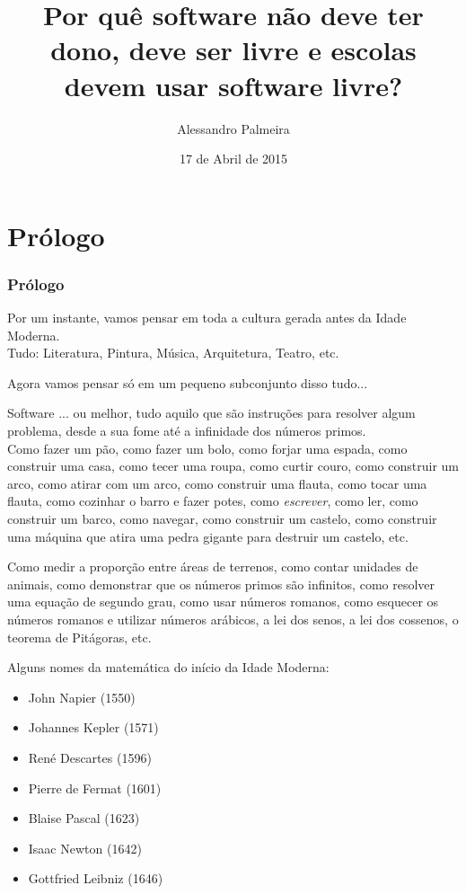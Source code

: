 \documentclass[serif,mathserif]{beamer}
\author[Alessandro Palmeira]{Alessandro Palmeira}
\title[Software Livre e Ensino\hspace{2em}\insertframenumber/\inserttotalframenumber]{Por quê software não deve ter dono, deve ser livre e escolas devem usar software livre?}
\date{17 de Abril de 2015} %
\institute{MAC0470 - Desenvolvimento de Software Livre}
\begin{document}
\maketitle

\section{Prólogo}  %

\begin{frame}
  \frametitle{Prólogo}
  Por um instante, vamos pensar em toda a cultura gerada antes da Idade Moderna.\pause\\
  Tudo: Literatura, Pintura, Música, Arquitetura, Teatro, etc.\pause
  
  \vspace{5mm} %
  Agora vamos pensar só em um pequeno subconjunto disso tudo...
\end{frame}

\begin{frame}
  Software\pause
  ... ou melhor, tudo aquilo que são instruções para resolver algum problema, desde a
  sua fome até a infinidade dos números primos.\pause\\
  Como fazer um pão, \pause como fazer um bolo, \pause como forjar uma espada, \pause como construir uma casa, \pause
  como tecer uma roupa, \pause como curtir couro, \pause como construir um arco, \pause como atirar com um arco, \pause
  como construir uma flauta, \pause como tocar uma flauta, \pause como cozinhar o barro e fazer potes, \pause
  como \emph{escrever}, \pause como ler, \pause como construir um barco, \pause como navegar, \pause como construir
  um castelo, \pause como construir uma máquina que atira uma pedra gigante para destruir
  um castelo, etc.
\end{frame}

\begin{frame}
  Como medir a proporção entre áreas de terrenos, \pause como contar unidades de animais, \pause
  como demonstrar que os números primos são infinitos, \pause como resolver uma equação de
  segundo grau, \pause como usar números romanos, \pause como esquecer os números romanos e utilizar
  números arábicos, \pause a lei dos senos, \pause a lei dos cossenos, \pause o teorema de Pitágoras, \pause etc.\pause
  
  \vspace{5mm} %
  Alguns nomes da matemática do início da Idade Moderna:\pause
  \begin{itemize}
    \item John Napier (1550)\pause
    \item Johannes Kepler (1571)\pause
    \item René Descartes (1596)\pause
    \item Pierre de Fermat (1601)\pause
    \item Blaise Pascal (1623)\pause
    \item Isaac Newton (1642)\pause
    \item Gottfried Leibniz (1646)
  \end{itemize}

\end{frame}
\end{document}
